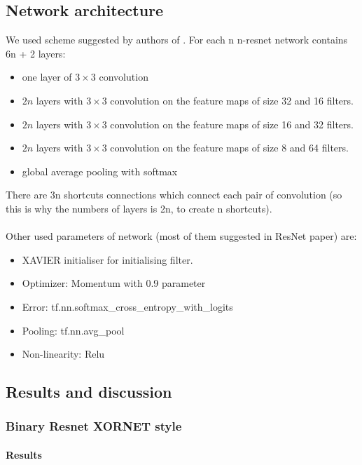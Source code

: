 \documentclass[licencjacka]{pracamgr}
\begin{document}
		\subsection{Network architecture}
			We used scheme suggested by authors of \cite{resnet}. For each n n-resnet network contains 6n + 2 layers:
			\begin{itemize}
			\item one layer of $3 \times 3$ convolution
			\item $2n$ layers with $3 \times 3$ convolution on the feature maps of size 32 and 16 filters.
			\item $2n$ layers with $3 \times 3$ convolution on the feature maps of size 16 and 32 filters.
			\item $2n$ layers with $3 \times 3$ convolution on the feature maps of size 8 and 64 filters.
			\item global average pooling with softmax
			\end{itemize}

			There are 3n shortcuts connections which connect each pair of convolution (so this is why the numbers of layers is 2n, to create n shortcuts).\\\\

			Other used parameters of network (most of them suggested in ResNet paper) are:
			\begin{itemize}
			\item XAVIER initialiser for initialising filter.
			\item Optimizer: Momentum with 0.9 parameter
			\item Error: tf.nn.softmax\_cross\_entropy\_with\_logits
			\item Pooling: tf.nn.avg\_pool
			\item Non-linearity: Relu
			\end{itemize}
		\subsection{Results and discussion}
			\subsubsection{Binary Resnet XORNET style}
		        \paragraph{Results} 
		        
\end{document}
